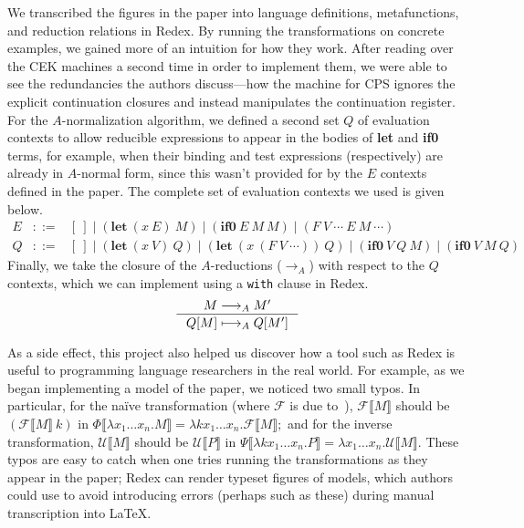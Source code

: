 \documentclass[11pt]{article}
\begin{document}
We transcribed the figures in the paper into language definitions,
metafunctions, and reduction relations in Redex. By running the transformations
on concrete examples, we gained more of an intuition for how they work. After
reading over the CEK machines a second time in order to implement them, we were
able to see the redundancies the authors discuss---how the machine for CPS
ignores the explicit continuation closures and instead manipulates the
continuation register.
%
For the $A$-normalization algorithm, we defined a second set $Q$ of evaluation
contexts to allow reducible expressions to appear in the bodies of \textbf{let}
and \textbf{if0} terms, for example, when their binding and test expressions
(respectively) are already in $A$-normal form, since this wasn't provided for
by the $E$ contexts defined in the paper.
%
The complete set of evaluation contexts we used is given below.
\[
\begin{array}{lcl}
  E & ::= & [\ ]\; |\; (\textbf{let}\ (x\ E)\ M)\; |\;
  (\textbf{if0}\ E\ M\ M)\; |\; (F\ V\ \cdots\ E\ M\ \cdots) \\[3pt]
  Q & ::= & [\ ]\; |\; (\textbf{let}\ (x\ V)\ Q)\; |\;
  (\textbf{let}\ (x\ (F\ V\ \cdots))\ Q)\; |\;
  (\textbf{if0}\ V\ Q\ M)\; |\; (\textbf{if0}\ V\ M\ Q)
\end{array}
\]
Finally, we take the closure of the $A$-reductions ($\longrightarrow_A$) with
respect to the $Q$ contexts, which we can implement using a \texttt{with}
clause in Redex.
\[
\inference{
  M \longrightarrow_A M'
}{
  Q[M] \longmapsto_A Q[M']
}
\]

As a side effect, this project also helped us discover how a tool such as Redex
is useful to programming language researchers in the real world. For example,
as we began implementing a model of the paper, we noticed two small typos. In
particular, for the na\"{i}ve transformation (where $\mathcal{F}$ is due
to~\citet{Fischer:1993ys}), $\mathcal{F}\llbracket{M\rrbracket}$ should be
$(\mathcal{F}\llbracket{M\rrbracket}\ k)$ in
$\Phi\llbracket{\lambda{x_1 \ldots x_n}.M\rrbracket} =
\lambda{k x_1 \ldots x_n}.\mathcal{F}\llbracket{M\rrbracket};$
and for the inverse transformation,
$\mathcal{U}\llbracket{M\rrbracket}$ should be
$\mathcal{U}\llbracket{P\rrbracket}$ in
$\Psi\llbracket{\lambda{k x_1 \ldots x_n}.P\rrbracket} =
\lambda{x_1 \ldots x_n}.\mathcal{U}\llbracket{M\rrbracket}.$
These typos are easy to catch when one tries running the transformations as
they appear in the paper; Redex can render typeset figures of models, which
authors could use to avoid introducing errors (perhaps such as these) during
manual transcription into \LaTeX.
%
\end{document}
